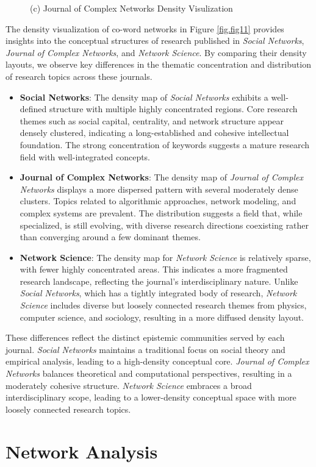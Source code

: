 \documentclass[twocolumn]{article}
\begin{document}
\begin{figure}
\begin{minipage}[b]{0.32\textwidth}
				(c) Journal of Complex Networks Density Visulization
			\end{minipage}
		\end{figure}
		
		The density visualization of co-word networks in Figure \ref{fig.fig11} provides insights into the conceptual structures of research published in \textit{Social Networks}, \textit{Journal of Complex Networks}, and \textit{Network Science}. By comparing their density layouts, we observe key differences in the thematic concentration and distribution of research topics across these journals.
		
		\begin{itemize}
			\item \textbf{Social Networks}: The density map of \textit{Social Networks} exhibits a well-defined structure with multiple highly concentrated regions. Core research themes such as social capital, centrality, and network structure appear densely clustered, indicating a long-established and cohesive intellectual foundation. The strong concentration of keywords suggests a mature research field with well-integrated concepts.
			
			\item \textbf{Journal of Complex Networks}: The density map of \textit{Journal of Complex Networks} displays a more dispersed pattern with several moderately dense clusters. Topics related to algorithmic approaches, network modeling, and complex systems are prevalent. The distribution suggests a field that, while specialized, is still evolving, with diverse research directions coexisting rather than converging around a few dominant themes.
			
			\item \textbf{Network Science}: The density map for \textit{Network Science} is relatively sparse, with fewer highly concentrated areas. This indicates a more fragmented research landscape, reflecting the journal’s interdisciplinary nature. Unlike \textit{Social Networks}, which has a tightly integrated body of research, \textit{Network Science} includes diverse but loosely connected research themes from physics, computer science, and sociology, resulting in a more diffused density layout.
		\end{itemize}
		
		These differences reflect the distinct epistemic communities served by each journal. \textit{Social Networks} maintains a traditional focus on social theory and empirical analysis, leading to a high-density conceptual core. \textit{Journal of Complex Networks} balances theoretical and computational perspectives, resulting in a moderately cohesive structure. \textit{Network Science} embraces a broad interdisciplinary scope, leading to a lower-density conceptual space with more loosely connected research topics.
		
		\section{Network Analysis}
		
		
	\pagebreak
	
	
	
\end{document}
